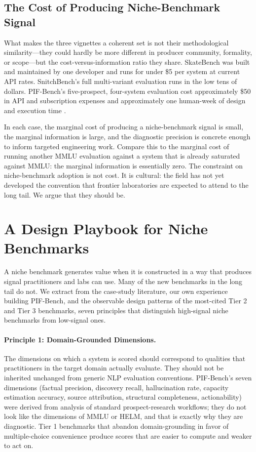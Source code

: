 \documentclass[11pt,a4paper]{article}
\begin{document}
\subsection{The Cost of Producing Niche-Benchmark Signal}
\label{sec:cost}

What makes the three vignettes a coherent set is not their methodological similarity---they could hardly be more different in producer community, formality, or scope---but the cost-versus-information ratio they share. SkateBench was built and maintained by one developer and runs for under \$5 per system at current API rates. SnitchBench's full multi-variant evaluation runs in the low tens of dollars. PIF-Bench's five-prospect, four-system evaluation cost approximately \$50 in API and subscription expenses and approximately one human-week of design and execution time \citep{lijo2026pifbench}.

In each case, the marginal cost of producing a niche-benchmark signal is small, the marginal information is large, and the diagnostic precision is concrete enough to inform targeted engineering work. Compare this to the marginal cost of running another MMLU evaluation against a system that is already saturated against MMLU: the marginal information is essentially zero. The constraint on niche-benchmark adoption is not cost. It is cultural: the field has not yet developed the convention that frontier laboratories are expected to attend to the long tail. We argue that they should be.

\section{A Design Playbook for Niche Benchmarks}
\label{sec:playbook}

A niche benchmark generates value when it is constructed in a way that produces signal practitioners and labs can use. Many of the new benchmarks in the long tail do not. We extract from the case-study literature, our own experience building PIF-Bench, and the observable design patterns of the most-cited Tier 2 and Tier 3 benchmarks, seven principles that distinguish high-signal niche benchmarks from low-signal ones.

\paragraph{Principle 1: Domain-Grounded Dimensions.}
The dimensions on which a system is scored should correspond to qualities that practitioners in the target domain actually evaluate. They should not be inherited unchanged from generic NLP evaluation conventions. PIF-Bench's seven dimensions (factual precision, discovery recall, hallucination rate, capacity estimation accuracy, source attribution, structural completeness, actionability) were derived from analysis of standard prospect-research workflows; they do not look like the dimensions of MMLU or HELM, and that is exactly why they are diagnostic. Tier 1 benchmarks that abandon domain-grounding in favor of multiple-choice convenience produce scores that are easier to compute and weaker to act on.
\end{document}
